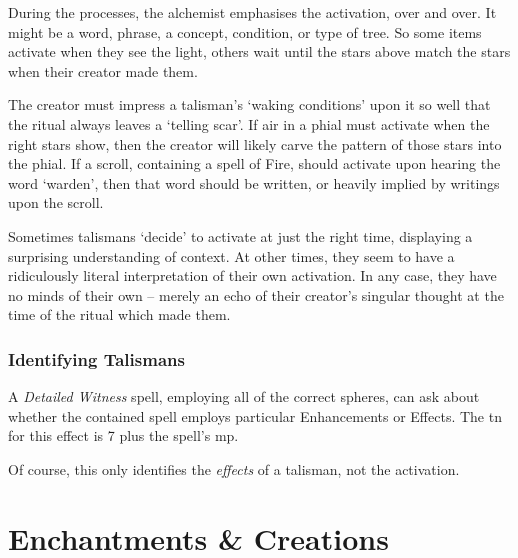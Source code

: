 \begin{multicols}{2}
During the processes, the alchemist emphasises the activation, over and over.
It might be a word, phrase, a concept, condition, or type of tree.
So some items activate when they see the light, others wait until the stars above match the stars when their creator made them.

The creator must impress a talisman's `waking conditions' upon it so well that the ritual always leaves a `telling scar'.
If air in a phial must activate when the right stars show, then the creator will likely carve the pattern of those stars into the phial.
If a scroll, containing a spell of Fire, should activate upon hearing the word `warden', then that word should be written, or heavily implied by writings upon the scroll.

Sometimes talismans `decide' to activate at just the right time, displaying a surprising understanding of context.
At other times, they seem to have a ridiculously literal interpretation of their own activation.
In any case, they have no minds of their own -- merely an echo of their creator's singular thought at the time of the ritual which made them.

\subsubsection{Identifying Talismans}

A \textit{Detailed Witness} spell, employing all of the correct spheres, can ask about whether the contained spell employs particular Enhancements or Effects.
The \gls{tn} for this effect is 7 plus the spell's \gls{mp}.

Of course, this only identifies the \emph{effects} of a talisman, not the activation.

\end{multicols}

\section{Enchantments \& Creations}
\label{magicalMinds}

